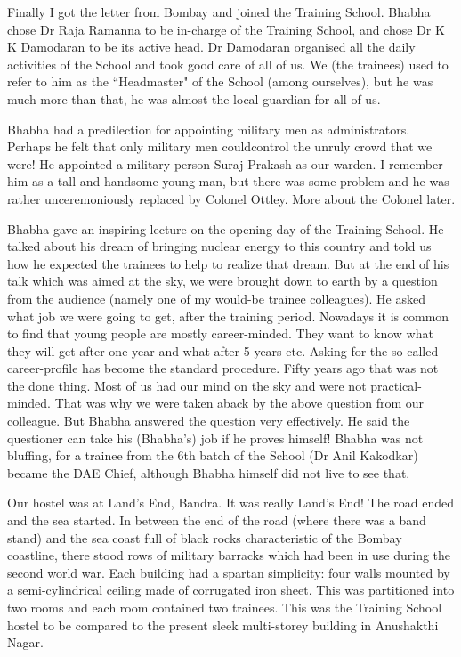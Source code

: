 Finally I got the letter from Bombay and joined the Trai\-ning School. Bhabha chose Dr Raja Ramanna to be in-charge of the Training School, and chose Dr K K Damodaran to be its active head. Dr Damodaran organised all the daily activities of the School and took good care of all of us. We (the trainees) used to refer to him as the ``Headmaster" of the School (among ourselves), but he was much more than that, he was almost the local guardian for all of us.
 
Bhabha had a predilection for appointing military men as admini\-strators. Perhaps he felt that only military men could\break control the unruly crowd that we were! He appointed a military person Suraj Prakash as our warden. I remember him as a tall and handsome young man, but there was some problem and he was rather unceremoniously replaced by Colonel Ottley. More about the Colonel later.

Bhabha gave an inspiring lecture on the opening day of the Training School. He talked about his dream of bringing nuclear energy to this country and told us how he expected the trainees to help to realize that dream. But at the end of his talk which was aimed at the sky, we were brought down to earth by a question from the audience (namely  one of my would-be trainee collea\-gues). He asked what job we were going to get, after the training period. Nowadays it is common to find that young people are mostly career-minded. They want to know what they will get after one year and what after 5 years etc. Asking for the so called career-profile has become the standard procedure. Fifty years ago that was not the done thing. Most of us had our mind on the sky and were not practical-minded. That was why we were taken aback by the above question from our colleague. But  Bhabha answered the question very effectively. He said the questioner can take his (Bhabha's) job if he proves himself! Bhabha was not bluffing, for a trainee from the 6th batch of the School (Dr Anil Kakodkar) became the DAE Chief, although Bhabha himself did not live to see that.
\newpage

Our hostel was at Land's End, Bandra. It was really Land's End! The road ended and the sea started. In between the end of the road (where there was a band stand) and the sea coast full of black rocks characteristic of the Bombay coastline, there stood rows of military barracks which had been in use during the second world war. Each building had a spartan simplicity: four walls mounted by a semi-cylindrical ceiling made of corrugated iron sheet. This was partitioned into two rooms and each room contained two trainees. This was the Training School hostel to be compared to the present sleek multi-storey building in Anushakthi Nagar.

